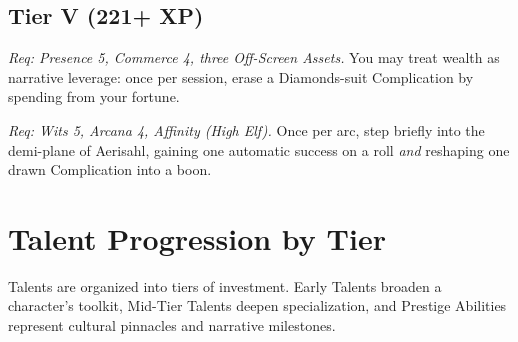 \documentclass[12pt]{article}
\begin{document}
\subsection*{Tier V (221+ XP)}
\begin{description}[leftmargin=2cm]
  \item[Master of Coin]  
  \emph{Req: Presence 5, Commerce 4, three Off-Screen Assets.}  
  You may treat wealth as narrative leverage: once per session, erase a Diamonds-suit Complication by spending from your fortune.  

  \item[Echo-Walker]  
  \emph{Req: Wits 5, Arcana 4, Affinity (High Elf).}  
  Once per arc, step briefly into the demi-plane of Aerisahl, gaining one automatic success on a roll \emph{and} reshaping one drawn Complication into a boon.  
\end{description}

\section{Talent Progression by Tier}

Talents are organized into tiers of investment. Early Talents broaden a character’s toolkit, Mid-Tier Talents deepen specialization, and Prestige Abilities represent cultural pinnacles and narrative milestones.  
\end{document}
